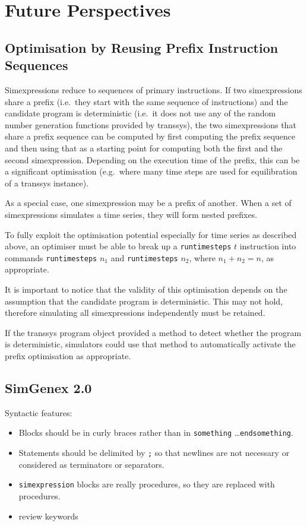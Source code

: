 \documentclass[a4paper,fleqn]{article}
\newcommand{\computercode}[1]{\texttt{#1}}
\begin{document}
\section{Future Perspectives}

\subsection{Optimisation by Reusing Prefix Instruction Sequences}

Simexpressions reduce to sequences of primary instructions. If two
simexpressions share a prefix (i.e.\ they start with the same sequence
of instructions) and the candidate program is deterministic (i.e.\ it
does not use any of the random number generation functions provided by
transsys), the two simexpressions that share a prefix sequence can be
computed by first computing the prefix sequence and then using that as
a starting point for computing both the first and the second
simexpression. Depending on the execution time of the prefix, this can
be a significant optimisation (e.g.\ where many time steps are used
for equilibration of a transsys instance).

As a special case, one simexpression may be a prefix of another.
When a set of simexpressions simulates a time series, they will form
nested prefixes.

To fully exploit the optimisation potential especially for time series
as described above, an optimiser must be able to break up a
\computercode{runtimesteps} $t$ instruction into commands
\computercode{runtimesteps} $n_1$ and \computercode{runtimesteps}
$n_2$, where $n_1 + n_2 = n$, as appropriate.

It is important to notice that the validity of this optimisation
depends on the assumption that the candidate program is
deterministic. This may not hold, therefore simulating all
simexpressions independently must be retained.

If the transsys program object provided a method to detect whether
the program is deterministic, simulators could use that method to
automatically activate the prefix optimisation as appropriate.


\subsection{SimGenex 2.0}

Syntactic features:

\begin{itemize}
\item Blocks should be in curly braces rather than in
  \computercode{something} \ldots \computercode{endsomething}.
\item Statements should be delimited by \computercode{;} so that
  newlines are not necessary or considered as terminators or
  separators.
\item \computercode{simexpression} blocks are really procedures, so
  they are replaced with procedures.
\item review keywords
\end{itemize}
\end{document}
